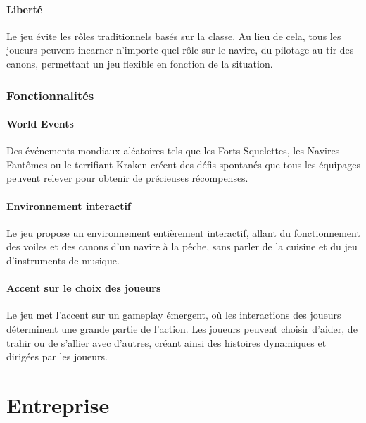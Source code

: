 \documentclass{article}
\begin{document}
\paragraph{Liberté}\hfill

Le jeu évite les rôles traditionnels basés sur la classe. Au lieu de cela, tous les joueurs peuvent incarner n'importe quel rôle sur le navire, du pilotage au tir des canons, permettant un jeu flexible en fonction de la situation.



\subsubsection{Fonctionnalités}
\paragraph{World Events}\hfill

Des événements mondiaux aléatoires tels que les Forts Squelettes, les Navires Fantômes ou le terrifiant Kraken créent des défis spontanés que tous les équipages peuvent relever pour obtenir de précieuses récompenses.

\paragraph{Environnement interactif}\hfill

Le jeu propose un environnement entièrement interactif, allant du fonctionnement des voiles et des canons d'un navire à la pêche, sans parler de la cuisine et du jeu d'instruments de musique.

\paragraph{Accent sur le choix des joueurs}\hfill

Le jeu met l'accent sur un gameplay émergent, où les interactions des joueurs déterminent une grande partie de l'action. Les joueurs peuvent choisir d'aider, de trahir ou de s'allier avec d'autres, créant ainsi des histoires dynamiques et dirigées par les joueurs.















\newpage
\section{Entreprise}
\end{document}
